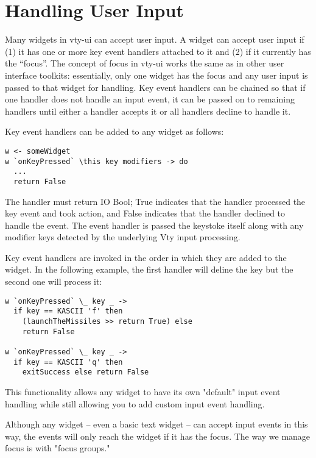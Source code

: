 \section{Handling User Input}

Many widgets in vty-ui can accept user input.  A widget can accept
user input if (1) it has one or more key event handlers attached to it
and (2) if it currently has the ``focus''.  The concept of focus in
vty-ui works the same as in other user interface toolkits:
essentially, only one widget has the focus and any user input is
passed to that widget for handling.  Key event handlers can be chained
so that if one handler does not handle an input event, it can be
passed on to remaining handlers until either a handler accepts it or
all handlers decline to handle it.

Key event handlers can be added to any widget as follows:

\begin{verbatim}
w <- someWidget
w `onKeyPressed` \this key modifiers -> do
  ...
  return False
\end{verbatim}

The handler must return IO Bool; True indicates that the handler
processed the key event and took action, and False indicates that the
handler declined to handle the event.  The event handler is passed the
keystoke itself along with any modifier keys detected by the underlying
Vty input processing.

Key event handlers are invoked in the order in which they are added to
the widget.  In the following example, the first handler will deline the
 key but the second one will process it:

\begin{verbatim}
w `onKeyPressed` \_ key _ ->
  if key == KASCII 'f' then
    (launchTheMissiles >> return True) else
    return False

w `onKeyPressed` \_ key _ ->
  if key == KASCII 'q' then
    exitSuccess else return False
\end{verbatim}

This functionality allows any widget to have its own "default" input
event handling while still allowing you to add custom input event
handling.

Although any widget -- even a basic text widget -- can accept input
events in this way, the events will only reach the widget if it has the
focus.  The way we manage focus is with "focus groups."
